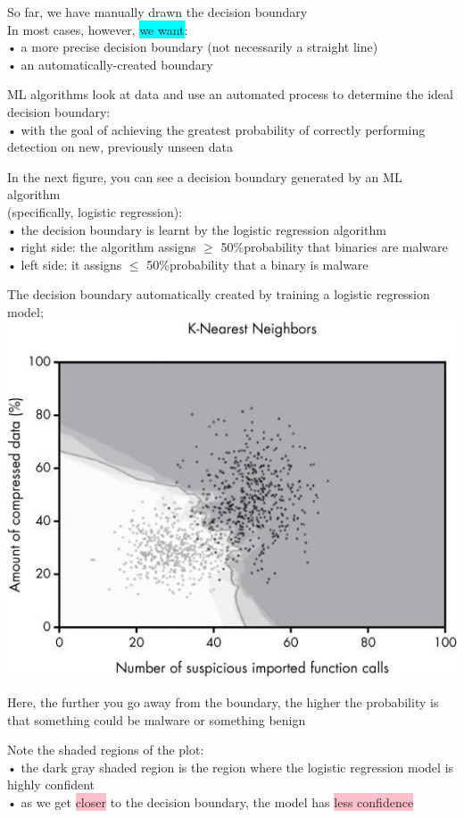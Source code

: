 \documentclass[]{project_plan}
\begin{document}
So far, we have manually drawn the decision boundary\\
In most cases, however, \colorbox{cyan}{we want}:\\
• a more precise decision boundary (not necessarily a straight line)\\
• an automatically-created boundary

ML algorithms look at data and use an automated process to determine the ideal
decision boundary:\\
• with the goal of achieving the greatest probability of correctly performing detection
on new, previously unseen data

In the next figure, you can see a decision boundary generated by an ML algorithm\\
(specifically, logistic regression):\\
• the decision boundary is learnt by the logistic regression algorithm\\
• right side: the algorithm assigns $\geq$ 50\%probability that binaries are malware\\
• left side: it assigns $\leq$ 50\%probability that a binary is malware

The decision boundary automatically created by training a logistic regression model;\\
\includegraphics[width=.6\linewidth]{mlpage47 (1).png}

Here, the further you go away from the boundary, the higher the probability
is that something could be malware or something benign

Note the shaded regions of the plot:\\
• the dark gray shaded region is the region where the logistic regression model is highly confident\\
• as we get \colorbox{pink}{closer} to the decision boundary, the model has \colorbox{pink}{less confidence}\\
\end{document}
